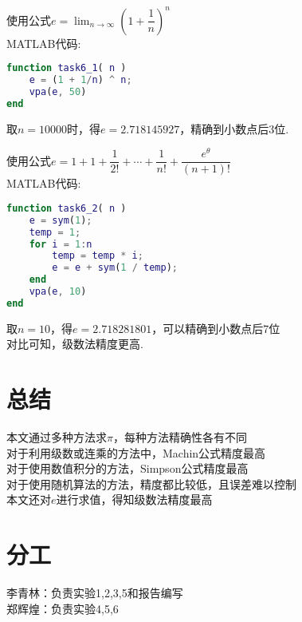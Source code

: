 \documentclass[12pt]{article}
\begin{document}
\begin{CJK*}{UTF8}{gbsn}
	使用公式$\displaystyle e=\lim_{n\to\infty}\left(1+\dfrac{1}{n}\right)^n$\\
	\newpage
	MATLAB代码:
	\begin{lstlisting}[language=matlab]
function task6_1( n )   
    e = (1 + 1/n) ^ n;
    vpa(e, 50)
end
	\end{lstlisting}
	
	取$n=10000$时，得$e=2.718145927$，精确到小数点后3位.
	
	使用公式$e=1+1+\dfrac{1}{2!}+\cdots+\dfrac{1}{n!}+\dfrac{e^\theta}{(n+1)!}$\\
	
	MATLAB代码:
	\begin{lstlisting}[language=matlab]
function task6_2( n )
    e = sym(1);
    temp = 1;
    for i = 1:n
        temp = temp * i;
        e = e + sym(1 / temp);
    end
    vpa(e, 10)
end
	\end{lstlisting}
	取$n=10$，得$e=2.718281801$，可以精确到小数点后7位\\
	对比可知，级数法精度更高.	
\section{总结}
	本文通过多种方法求$\pi$，每种方法精确性各有不同\\
	对于利用级数或连乘的方法中，Machin公式精度最高\\
	对于使用数值积分的方法，Simpson公式精度最高\\
	对于使用随机算法的方法，精度都比较低，且误差难以控制\\
	本文还对$e$进行求值，得知级数法精度最高\\
\section{分工}
	李青林：负责实验1,2,3,5和报告编写\\
	郑辉煌：负责实验4,5,6
\end{CJK*}
\end{document}
